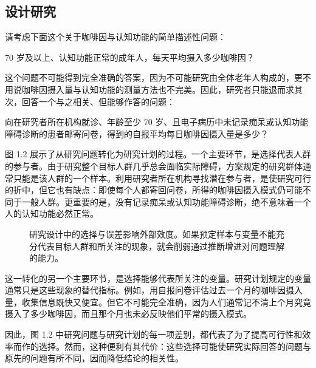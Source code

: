\subsection{设计研究}
请考虑下面这个关于咖啡因与认知功能的简单描述性问题：
\begin{studyquote}
70 岁及以上、认知功能正常的成年人，每天平均摄入多少咖啡因？
\end{studyquote}
这个问题不可能得到完全准确的答案，因为不可能研究由全体老年人构成的，更不用说咖啡因摄入量与认知功能的测量方法也不完美。因此，研究者只能退而求其次，回答一个与之相关、但能够作答的问题：
\begin{studyquote}
向在研究者所在机构就诊、年龄至少 70 岁、且电子病历中未记录痴呆或认知功能障碍诊断的患者邮寄问卷，得到的自报平均每日咖啡因摄入量是多少？
\end{studyquote}

图 1.2 展示了从研究问题转化为研究计划的过程。一个主要环节，是选择代表人群的参与者。由于研究整个目标人群几乎总会面临实际障碍，方案规定的研究群体通常只能是该人群的一个样本。利用研究者所在机构寻找潜在参与者，是使研究可行的折中，但它也有缺点：即使每个人都寄回问卷，所得的咖啡因摄入模式仍可能不同于一般人群。更重要的是，没有记录痴呆或认知功能障碍诊断，绝不意味着一个人的认知功能必然正常。
\par
\begin{figure}[htbp]\centering\chonedesignflow
\caption{研究设计中的选择与误差影响外部效度。如果预定样本与变量不能充分代表目标人群和所关注的现象，就会削弱通过推断增进对问题理解的能力。}\label{fig:01_02}\end{figure}\par

这一转化的另一个主要环节，是选择能够代表所关注的变量。研究计划规定的变量通常只是这些现象的替代指标。例如，用自报问卷评估过去一个月的咖啡因摄入量，收集信息既快又便宜。但它不可能完全准确，因为人们通常记不清上个月究竟摄入了多少咖啡因，而且那个月也未必反映他们平常的摄入模式。

因此，图 1.2 中研究问题与研究计划的每一项差别，都代表了为了提高可行性和效率而作的选择。然而，这种便利有其代价：这些选择可能使研究实际回答的问题与原先的问题有所不同，因而降低结论的相关性。

